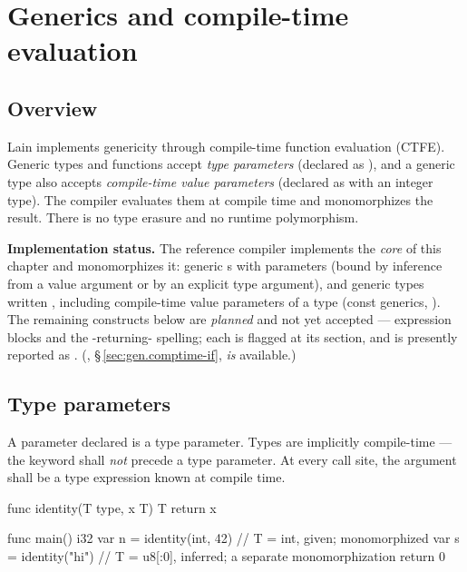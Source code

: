 \chapter{Generics and compile-time evaluation}
\label{sec:14-generics}

\section{Overview}
\label{sec:gen.overview}

\pnum
Lain implements genericity through compile-time function evaluation (CTFE).
Generic types and functions accept \textit{type parameters} (declared as
), and a generic type also accepts \textit{compile-time value
parameters} (declared as  with  an integer type).  The
compiler evaluates them at compile time and monomorphizes the result.  There is
no type erasure and no runtime polymorphism.

\begin{note}
  \textbf{Implementation status.}  The reference compiler implements the
  \emph{core} of this chapter and monomorphizes it: generic s with
   parameters (bound by inference from a value argument or by an
  explicit type argument), and generic types written
  , including compile-time value parameters of a
  type (const generics, ).  The remaining constructs below are
  \emph{planned} and not yet accepted ---  expression
  blocks and the -returning- spelling; each is flagged at
  its section, and is presently reported as .  (,
  \S\,\ref{sec:gen.comptime-if}, \emph{is} available.)
\end{note}

\section{Type parameters}
\label{sec:gen.type-params}

\pnum
A parameter declared  is a type parameter.  Types are
implicitly compile-time — the  keyword shall \emph{not}
precede a type parameter.  At every call site, the argument shall be a type
expression known at compile time.

\begin{laincode}
func identity(T type, x T) T {
    return x
}

func main() i32 {
    var n = identity(int, 42)       // T = int, given; monomorphized
    var s = identity("hi")          // T = u8[:0], inferred; a separate monomorphization
    return 0
}
\end{laincode}

